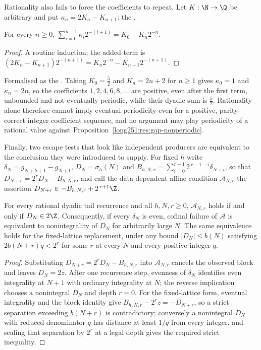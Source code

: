 Rationality also fails to force the coefficients to repeat.  Let $K:\N\to\Q$ be
arbitrary and put $\kappa_n=2K_n-K_{n+1}$: the
.

\begin{proposition}\label{long251:res:telescope}
For every $n\ge0$,
$\sum_{i=0}^{n-1}\kappa_i2^{-(i+1)}=K_0-K_n2^{-n}$.
\end{proposition}

\begin{proof}
A routine induction; the added term is
$(2K_n-K_{n+1})2^{-(n+1)}=K_n2^{-n}-K_{n+1}2^{-(n+1)}$.
\end{proof}

\noindent Formalised as the
.  Taking $K_0=\tfrac52$ and $K_n=2n+2$ for $n\ge1$ gives
$\kappa_0=1$ and $\kappa_n=2n$, so the coefficients $1,2,4,6,8,\ldots$ are
positive, even after the first term, unbounded and not eventually periodic,
while their dyadic sum is $\tfrac52$.  Rationality alone therefore cannot imply
eventual periodicity even for a positive, parity-correct integer coefficient
sequence, and no argument may play periodicity of a rational value against
Proposition~\ref{long251:res:gap-nonperiodic}.

Finally, two escape tests that look like independent producers are equivalent
to the conclusion they were introduced to supply.  For fixed $h$ write
$\delta_N=g_{N+h+1}-g_{N+1}$, $D_N=\sigma_h(N)$ and
$B_{h,N,r}=\sum_{i=0}^{r-1}2^{\,r-1-i}\delta_{N+i}$, so that
$D_{N+r}=2^{r}D_N-B_{h,N,r}$, and call the data-dependent affine condition
$\mathcal A_{N,r}$ the assertion $D_{N+r}\in-B_{h,N,r}+2^{\,r+1}\Z$.

\begin{theorem}\label{long251:res:affinecollapse}
For every rational dyadic tail recurrence and all $h,N,r\ge0$,
$\mathcal A_{N,r}$ holds if and only if $D_N\in2\Z$.  Consequently, if every
$\delta_N$ is even, cofinal failure of $\mathcal A$ is equivalent to
nonintegrality of $D_N$ for arbitrarily large $N$.  The same equivalence holds
for the fixed-lattice replacement, under any bound $|D_N|\le b(N)$ satisfying
$2b(N+r)q<2^{r}$ for some $r$ at every $N$ and every positive integer $q$.
\end{theorem}

\begin{proof}
Substituting $D_{N+r}=2^{r}D_N-B_{h,N,r}$ into $\mathcal A_{N,r}$ cancels the
observed block and leaves $D_N=2z$.  After one recurrence step, evenness of
$\delta_N$ identifies even integrality at $N+1$ with ordinary integrality at
$N$; the reverse implication chooses a nonintegral $D_N$ and depth $r=0$.  For
the fixed-lattice form, eventual integrality and the block identity give
$B_{h,N,r}-2^{r}z=-D_{N+r}$, so a strict separation exceeding $b(N+r)$ is
contradictory; conversely a nonintegral $D_N$ with reduced denominator $q$ has
distance at least $1/q$ from every integer, and scaling that separation by
$2^{r}$ at a legal depth gives the required strict inequality.
\end{proof}

